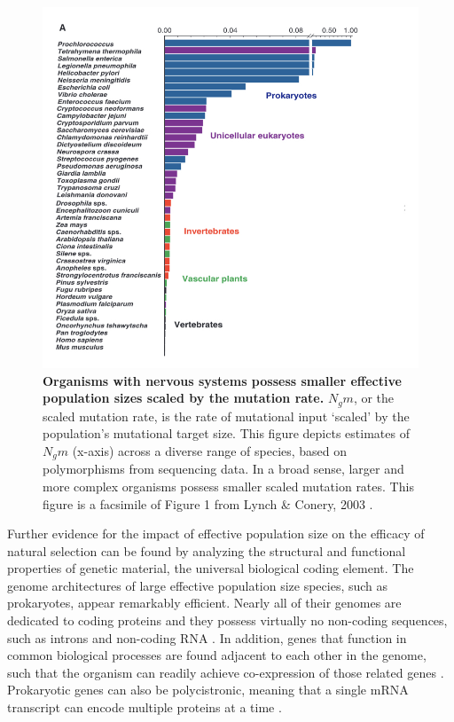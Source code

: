 \documentclass[twocolumn]{article}
\begin{document}
\begin{figure}[htp]
\centering
\includegraphics[width=8.5 cm]{fig_2.jpeg}
\caption{\textbf{Organisms with nervous systems possess smaller effective population sizes scaled by the mutation rate.} $N_g m$, or the scaled mutation rate, is the rate of mutational input `scaled' by the population's mutational target size. This figure depicts estimates of $N_g m$ (x-axis) across a diverse range of species, based on polymorphisms from sequencing data. In a broad sense, larger and more complex organisms possess smaller scaled mutation rates. This figure is a facsimile of Figure 1 from Lynch \& Conery, 2003 \cite{Lynch_Conery_2003}.}
\end{figure}

Further evidence for the impact of effective population size on the efficacy of natural selection can be found by analyzing the structural and functional properties of genetic material, the universal biological coding element. The genome architectures of large effective population size species, such as prokaryotes, appear remarkably efficient. Nearly all of their genomes are dedicated to coding proteins and they possess virtually no non-coding sequences, such as introns and non-coding RNA \cite{lynch2007origins, milo2016cell}. In addition, genes that function in common biological processes are found adjacent to each other in the genome, such that the organism can readily achieve co-expression of those related genes \cite{overbeek_matlsev_1999}. Prokaryotic genes can also be polycistronic, meaning that a single mRNA transcript can encode multiple proteins at a time \cite{kozak_1999}. 
\end{document}
